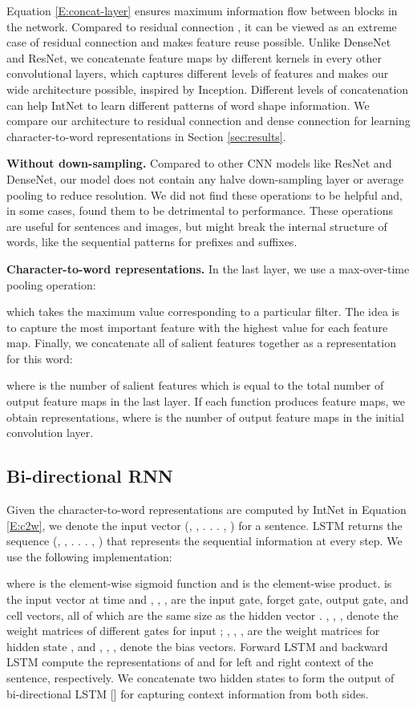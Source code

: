 \documentclass[11pt,a4paper]{article}
\begin{document}
Equation \ref{E:concat-layer} ensures maximum information flow between blocks in the network. Compared to residual connection , it can be viewed as an extreme case of residual connection and makes feature reuse possible. Unlike DenseNet and ResNet, we concatenate feature maps by different kernels in every other convolutional layers, which captures different levels of features and makes our wide architecture possible, inspired by Inception. Different levels of concatenation can help IntNet to learn different patterns of word shape information. We compare our architecture to residual connection and dense connection for learning character-to-word representations in Section \ref{sec:results}. 

\textbf{Without down-sampling.} Compared to other CNN models like ResNet and DenseNet, our model does not contain any halve down-sampling layer or average pooling to reduce resolution. We did not find these operations to be helpful and, in some cases, found them to be detrimental to performance. These operations are useful for sentences and images, but might break the internal structure of words, like the sequential patterns for prefixes and suffixes. 

\textbf{Character-to-word representations.} In the last layer, we use a max-over-time pooling operation:


which takes the maximum value corresponding to a particular filter. The idea is to capture the most important feature with the highest value for each feature map. Finally, we concatenate all of salient features together as a representation for this word: 


where  is the number of salient features which is equal to the total number of output feature maps in the last layer. If each function  produces  feature maps, we obtain  representations, where  is the number of output feature maps in the initial convolution layer.

\subsection{Bi-directional RNN}

Given the character-to-word representations are computed by IntNet in Equation \ref{E:c2w}, we denote the input vector (, , . . . , ) for a sentence. LSTM \cite{hochreiter1997long} returns the sequence (, , . . . , ) that represents the sequential information at every step. We use the following implementation:


where  is the element-wise sigmoid function and  is the element-wise product.  is the input vector at time  and , , ,  are the input gate, forget gate, output gate, and cell vectors, all of which are the same size as the hidden vector . , , ,  denote the weight matrices of different gates for input ; , , ,  are the weight matrices for hidden state , and , , ,  denote the bias vectors. Forward LSTM and backward LSTM compute the representations of  and  for left and right context of the sentence, respectively. We concatenate two hidden states to form the output of bi-directional LSTM  [] for capturing context information from both sides. 
\end{document}
